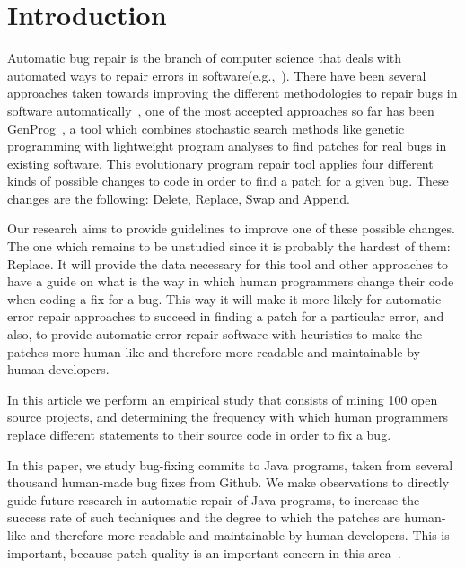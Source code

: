 
\section{Introduction}

Automatic bug repair is the branch of computer science that deals with automated ways to repair errors in software(e.g.,~\cite{kim2013, legoues2012, Mechtaev15, Long2016}). There have been several approaches taken towards improving the different methodologies to repair bugs in software automatically~\cite{kim2013, weimer2009, legoues2012, kai}, one of the most accepted approaches so far has been GenProg~\cite{weimer2009, legoues2012}, a tool which combines stochastic search methods like genetic programming with lightweight program analyses to find patches for real bugs in existing software. This evolutionary program repair tool applies four different kinds of possible changes to code in order to find a patch for a given bug. These changes are the following: Delete, Replace, Swap and Append.

Our research aims to provide guidelines to improve one of these possible changes. The one which remains to be unstudied since it is probably the hardest of them: Replace. It will provide the data necessary for this tool and other approaches to have a guide on what is the way in which human programmers change their code when coding a fix for a bug. This way it will make it more likely for automatic error repair approaches to succeed in finding a patch for a particular error, and also, to provide automatic error repair software with heuristics to make the patches more human-like and therefore more readable and maintainable by human developers.

In this article we perform an empirical study that consists of mining 100 open source projects, and determining the frequency with which human programmers replace different statements to their source code in order to fix a bug.



In this paper, we study bug-fixing commits to Java programs, 
taken from several thousand human-made bug fixes from Github. We make
observations to directly guide future research in automatic repair of Java
programs, to increase the success rate of such techniques and the degree to
which the patches are human-like and therefore more readable and maintainable by
human developers. This is important, because patch quality is an important
concern in this area~\cite{Qi15}.

